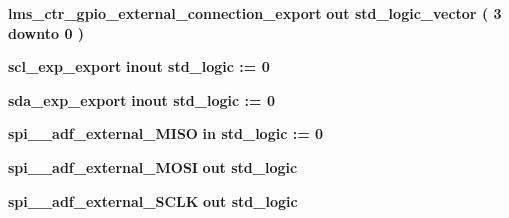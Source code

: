 \begin{DoxyCompactItemize}
{\bf lms\+\_\+ctr\+\_\+gpio\+\_\+external\+\_\+connection\+\_\+export}  {\bfseries {\bfseries \textcolor{keywordflow}{out}\textcolor{vhdlchar}{ }}} {\bfseries \textcolor{comment}{std\+\_\+logic\+\_\+vector}\textcolor{vhdlchar}{ }\textcolor{vhdlchar}{(}\textcolor{vhdlchar}{ }\textcolor{vhdlchar}{ } \textcolor{vhdldigit}{3} \textcolor{vhdlchar}{ }\textcolor{keywordflow}{downto}\textcolor{vhdlchar}{ }\textcolor{vhdlchar}{ } \textcolor{vhdldigit}{0} \textcolor{vhdlchar}{ }\textcolor{vhdlchar}{)}\textcolor{vhdlchar}{ }} 
\item 
{\bf scl\+\_\+exp\+\_\+export}  {\bfseries {\bfseries \textcolor{keywordflow}{inout}\textcolor{vhdlchar}{ }}} {\bfseries \textcolor{comment}{std\+\_\+logic}\textcolor{vhdlchar}{ }\textcolor{vhdlchar}{ }\textcolor{vhdlchar}{\+:}\textcolor{vhdlchar}{=}\textcolor{vhdlchar}{ }\textcolor{vhdlchar}{ }\textcolor{vhdlchar}{\textquotesingle{}}\textcolor{vhdlchar}{ } \textcolor{vhdldigit}{0} \textcolor{vhdlchar}{ }\textcolor{vhdlchar}{\textquotesingle{}}\textcolor{vhdlchar}{ }} 
\item 
{\bf sda\+\_\+exp\+\_\+export}  {\bfseries {\bfseries \textcolor{keywordflow}{inout}\textcolor{vhdlchar}{ }}} {\bfseries \textcolor{comment}{std\+\_\+logic}\textcolor{vhdlchar}{ }\textcolor{vhdlchar}{ }\textcolor{vhdlchar}{\+:}\textcolor{vhdlchar}{=}\textcolor{vhdlchar}{ }\textcolor{vhdlchar}{ }\textcolor{vhdlchar}{\textquotesingle{}}\textcolor{vhdlchar}{ } \textcolor{vhdldigit}{0} \textcolor{vhdlchar}{ }\textcolor{vhdlchar}{\textquotesingle{}}\textcolor{vhdlchar}{ }} 
\item 
{\bf spi\+\_\+\_\+adf\+\_\+external\+\_\+\+M\+I\+SO}  {\bfseries {\bfseries \textcolor{keywordflow}{in}\textcolor{vhdlchar}{ }}} {\bfseries \textcolor{comment}{std\+\_\+logic}\textcolor{vhdlchar}{ }\textcolor{vhdlchar}{ }\textcolor{vhdlchar}{\+:}\textcolor{vhdlchar}{=}\textcolor{vhdlchar}{ }\textcolor{vhdlchar}{ }\textcolor{vhdlchar}{\textquotesingle{}}\textcolor{vhdlchar}{ } \textcolor{vhdldigit}{0} \textcolor{vhdlchar}{ }\textcolor{vhdlchar}{\textquotesingle{}}\textcolor{vhdlchar}{ }} 
\item 
{\bf spi\+\_\+\_\+adf\+\_\+external\+\_\+\+M\+O\+SI}  {\bfseries {\bfseries \textcolor{keywordflow}{out}\textcolor{vhdlchar}{ }}} {\bfseries \textcolor{comment}{std\+\_\+logic}\textcolor{vhdlchar}{ }} 
\item 
{\bf spi\+\_\+\_\+adf\+\_\+external\+\_\+\+S\+C\+LK}  {\bfseries {\bfseries \textcolor{keywordflow}{out}\textcolor{vhdlchar}{ }}} {\bfseries \textcolor{comment}{std\+\_\+logic}\textcolor{vhdlchar}{ }} 

\end{DoxyCompactItemize}
